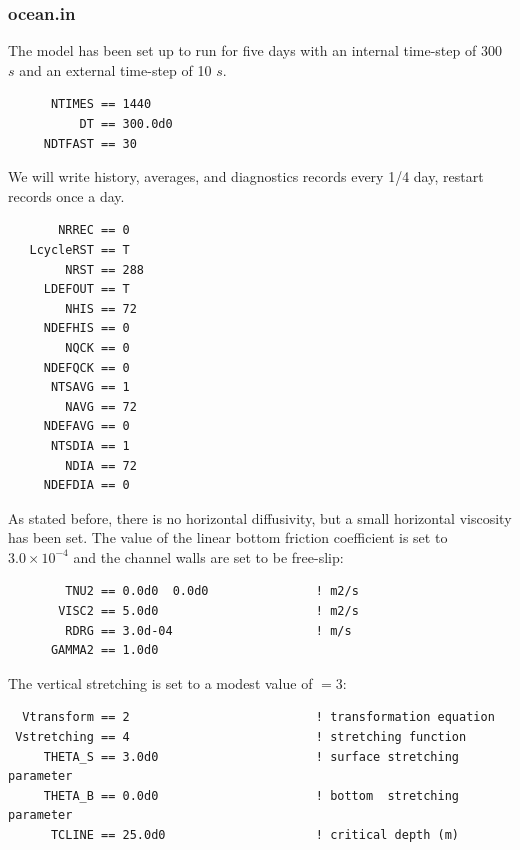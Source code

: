 \subsubsection{ocean.in}
The model has been set up to run for five days with an internal time-step
of 300 $s$ and an external time-step of 10 $s$.
\begin{verbatim}
      NTIMES == 1440
          DT == 300.0d0
     NDTFAST == 30
\end{verbatim}
  We will write history, averages, and diagnostics
records every 1/4 day, restart records once a day.
\begin{verbatim}
       NRREC == 0
   LcycleRST == T
        NRST == 288
     LDEFOUT == T
        NHIS == 72
     NDEFHIS == 0
        NQCK == 0
     NDEFQCK == 0
      NTSAVG == 1
        NAVG == 72
     NDEFAVG == 0
      NTSDIA == 1
        NDIA == 72
     NDEFDIA == 0
\end{verbatim}
As stated before, there is no horizontal diffusivity, but a small
horizontal viscosity has been set. The value of the linear bottom
friction coefficient  is set to $3.0 \times 10^{-4}$ and the
channel walls are set to be free-slip:
\begin{verbatim}
        TNU2 == 0.0d0  0.0d0               ! m2/s
       VISC2 == 5.0d0                      ! m2/s
        RDRG == 3.0d-04                    ! m/s
      GAMMA2 == 1.0d0
\end{verbatim}
The vertical stretching is set to a modest value of
$=3$:
\begin{verbatim}
  Vtransform == 2                          ! transformation equation
 Vstretching == 4                          ! stretching function
     THETA_S == 3.0d0                      ! surface stretching parameter
     THETA_B == 0.0d0                      ! bottom  stretching parameter
      TCLINE == 25.0d0                     ! critical depth (m)
\end{verbatim}

